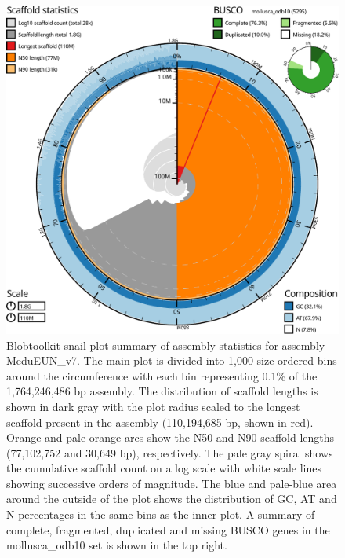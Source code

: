 \documentclass[11pt, a4paper]{article}
\begin{document}
\begin{figure}
	\includegraphics[width=\linewidth]{figures/btk_snail_MeduEUN_v7}
	\caption{Blobtoolkit snail plot summary of assembly statistics for assembly MeduEUN\_v7. The main plot is divided into 1,000 size-ordered bins around the circumference with each bin representing 0.1\% of the 1,764,246,486 bp assembly. The distribution of scaffold lengths is shown in dark gray with the plot radius scaled to the longest scaffold present in the assembly (110,194,685 bp, shown in red). Orange and pale-orange arcs show the N50 and N90 scaffold lengths (77,102,752 and 30,649 bp), respectively. The pale gray spiral shows the cumulative scaffold count on a log scale with white scale lines showing successive orders of magnitude. The blue and pale-blue area around the outside of the plot shows the distribution of GC, AT and N percentages in the same bins as the inner plot. A summary of complete, fragmented, duplicated and missing BUSCO genes in the mollusca\_odb10 set is shown in the top right.}
	\label{supfig:btk-snail-MeduEUN}
\end{figure}



\end{document}
